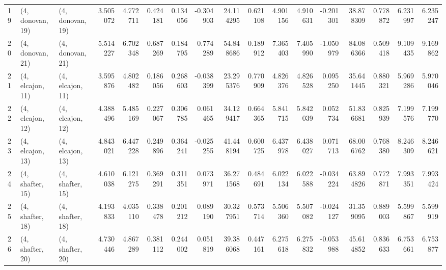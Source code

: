 \begin{tabular}{lllrrrrrrrrrrrrrr}
19 &  (4, donovan, 19) &  (4, donovan, 19) &  3.505072 &  4.772711 &   0.424181 &  0.134056 & -0.304903 &   24.114295 &  0.621108 &   4.901156 &   4.910631 & -0.201301 &   38.878309 &  0.778872 &   6.231997 &   6.235247 \\
20 &  (4, donovan, 21) &  (4, donovan, 21) &  5.514227 &  6.702348 &   0.687269 &  0.184795 &  0.774289 &   54.848686 &  0.189912 &   7.365403 &   7.405990 & -1.050979 &   84.086366 &  0.509418 &   9.109435 &   9.169862 \\
21 &  (4, elcajon, 11) &  (4, elcajon, 11) &  3.595876 &  4.802482 &   0.186056 &  0.268603 & -0.038399 &   23.295376 &  0.770909 &   4.826376 &   4.826528 &  0.095250 &   35.641445 &  0.880321 &   5.969286 &   5.970046 \\
22 &  (4, elcajon, 12) &  (4, elcajon, 12) &  4.388496 &  5.485169 &   0.227067 &  0.306785 &  0.061465 &   34.129417 &  0.664365 &   5.841715 &   5.842039 &  0.052734 &   51.836681 &  0.825939 &   7.199576 &   7.199770 \\
23 &  (4, elcajon, 13) &  (4, elcajon, 13) &  4.843021 &  6.447228 &   0.249896 &  0.364241 & -0.025255 &   41.448194 &  0.600725 &   6.437978 &   6.438027 &  0.071713 &   68.006762 &  0.768380 &   8.246309 &   8.246621 \\
24 &  (4, shafter, 15) &  (4, shafter, 15) &  4.610038 &  6.121275 &   0.369291 &  0.311351 &  0.073971 &   36.271568 &  0.484691 &   6.022134 &   6.022588 & -0.034224 &   63.894826 &  0.772871 &   7.993351 &   7.993424 \\
25 &  (4, shafter, 18) &  (4, shafter, 18) &  4.193833 &  4.035110 &   0.338478 &  0.201212 &  0.089190 &   30.327951 &  0.573714 &   5.506360 &   5.507082 & -0.024127 &   31.359095 &  0.889003 &   5.599867 &   5.599919 \\
26 &  (4, shafter, 20) &  (4, shafter, 20) &  4.730446 &  4.867289 &   0.381112 &  0.244002 &  0.051819 &   39.386068 &  0.447161 &   6.275618 &   6.275832 & -0.053988 &   45.614852 &  0.836633 &   6.753661 &   6.753877 \\
\bottomrule
\end{tabular}
